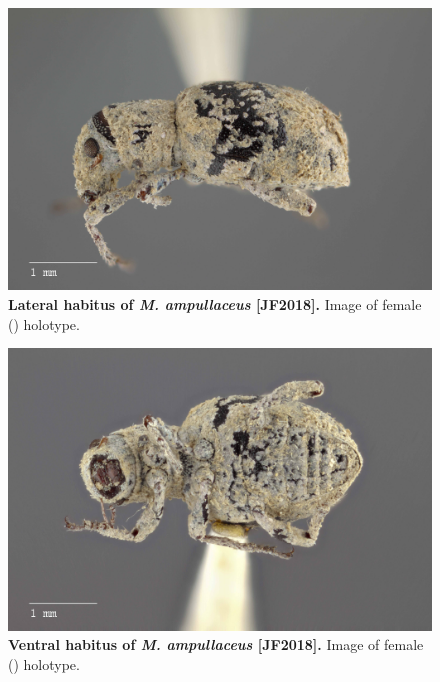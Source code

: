 \documentclass[fleqn,10pt,lineno]{wlpeerj} %
\begin{document}
\begin{figure}[h]
	\begin{sideways}
		\centering
		\includegraphics[height=\textwidth]{figure9.jpg}
	\end{sideways}
	\caption{\textbf{Lateral habitus of \textit{M. ampullaceus} [JF2018].} Image of female (\female) holotype.}
	\label{fig:ampullaceus_F_lateral}
\end{figure}

\begin{figure}[h]
	\begin{sideways}
		\centering
		\includegraphics[height=\textwidth]{figure10.jpg}
	\end{sideways}
	\caption{\textbf{Ventral habitus of \textit{M. ampullaceus} [JF2018].} Image of female (\female) holotype.}
	\label{fig:ampullaceus_F_ventral}
\end{figure}
\end{document}
